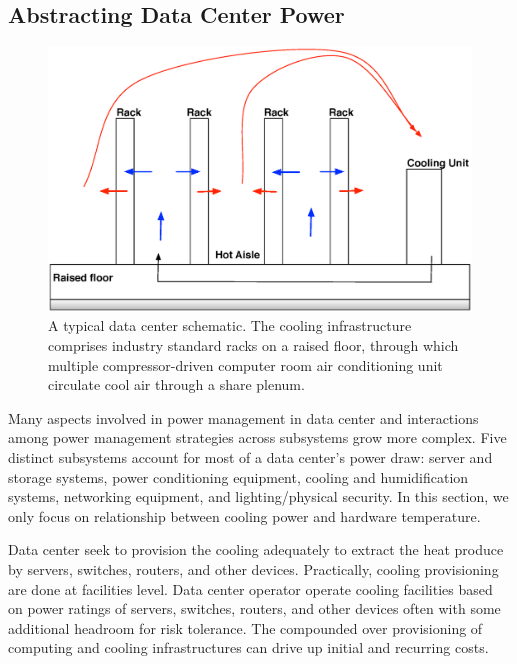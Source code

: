 \documentclass[conference]{IEEEtran}
\begin{document}
\subsection{Abstracting Data Center Power}\label{thermodynamics}
\begin{figure}[thb]
\begin{center}
\includegraphics[scale=0.3]{graphs/datacenter.eps}
\end{center}
\caption{A typical data center schematic.
The cooling infrastructure comprises industry standard racks on a raised floor, through which multiple compressor-driven computer room air conditioning unit circulate cool air through a share plenum.}
\label{fig:datacenter}
\end{figure} 
Many aspects involved in power management in data center and interactions among power management strategies across subsystems grow more complex.
Five distinct subsystems account for most of a data center's power draw:   server and storage systems, power conditioning equipment, cooling and humidification systems, networking equipment, and lighting/physical security.
In this section, we only focus on relationship between cooling power and hardware temperature.

Data center seek to provision the cooling adequately to extract the heat produce by servers, switches, routers, and other devices.
Practically, cooling provisioning are done at facilities level.
Data center operator operate cooling facilities based on power ratings of servers, switches, routers, and other devices often with some additional headroom for risk tolerance. 
The compounded over provisioning of computing and cooling infrastructures can drive up initial and recurring costs. 
\end{document}

